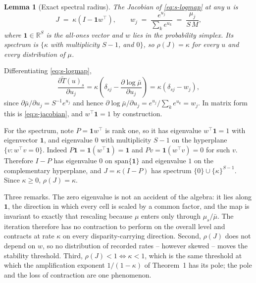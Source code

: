 \documentclass[journal,10pt,onecolumn]{IEEEtran}
\newtheorem{lemma}{Lemma}
\begin{document}
\begin{lemma}[Exact spectral radius]
\label{lem:spectral}
The Jacobian of \eqref{eq:s-logmap} at any $u$ is
\begin{equation}
\label{eq:s-jacobian}
J \;=\; \kappa\left(I - \mathbf{1}w^{\!\top}\right),
\qquad
w_j \;=\; \frac{e^{u_j}}{\textstyle\sum_k e^{u_k}} \;=\; \frac{\mu_j}{S\,M},
\end{equation}
where $\mathbf{1} \in \mathbb{R}^S$ is the all-ones vector and $w$ lies in the
probability simplex. Its spectrum is $\{\kappa$ with multiplicity $S-1$, and
$0\}$, so $\rho(J) = \kappa$ for every $u$ and every distribution of $\mu$.
\end{lemma}

\begin{IEEEproof}
Differentiating \eqref{eq:s-logmap},
\begin{equation}
\frac{\partial \widetilde{T}(u)_s}{\partial u_j}
= \kappa\left(\delta_{sj} - \frac{\partial \log \bar{\mu}}{\partial u_j}\right)
= \kappa\left(\delta_{sj} - w_j\right),
\end{equation}
since $\partial \bar{\mu}/\partial u_j = S^{-1}e^{u_j}$ and hence
$\partial \log\bar{\mu}/\partial u_j = e^{u_j}/\sum_k e^{u_k} = w_j$. In matrix
form this is \eqref{eq:s-jacobian}, and $w^{\!\top}\mathbf{1} = 1$ by
construction.

For the spectrum, note $P = \mathbf{1}w^{\!\top}$ is rank one, so it has
eigenvalue $w^{\!\top}\mathbf{1} = 1$ with eigenvector $\mathbf{1}$, and
eigenvalue $0$ with multiplicity $S-1$ on the hyperplane
$\{v : w^{\!\top}v = 0\}$. Indeed $P\mathbf{1} = \mathbf{1}(w^{\!\top}\mathbf{1})
= \mathbf{1}$ and $Pv = \mathbf{1}(w^{\!\top}v) = 0$ for such $v$. Therefore
$I - P$ has eigenvalue $0$ on $\mathrm{span}\{\mathbf{1}\}$ and eigenvalue $1$ on
the complementary hyperplane, and $J = \kappa(I-P)$ has spectrum
$\{0\} \cup \{\kappa\}^{S-1}$. Since $\kappa \ge 0$, $\rho(J) = \kappa$.
\end{IEEEproof}

Three remarks. The zero eigenvalue is not an accident of the algebra: it lies
along $\mathbf{1}$, the direction in which every cell is scaled by a common
factor, and the map is invariant to exactly that rescaling because $\mu$ enters
only through $\mu_s/\bar{\mu}$. The iteration therefore has no contraction to
perform on the overall level and contracts at rate $\kappa$ on every
disparity-carrying direction. Second, $\rho(J)$ does not depend on $w$, so no
distribution of recorded rates -- however skewed -- moves the stability
threshold. Third, $\rho(J) < 1 \iff \kappa < 1$, which is the same threshold at
which the amplification exponent $1/(1-\kappa)$ of Theorem~1 has its pole; the
pole and the loss of contraction are one phenomenon.
\end{document}
